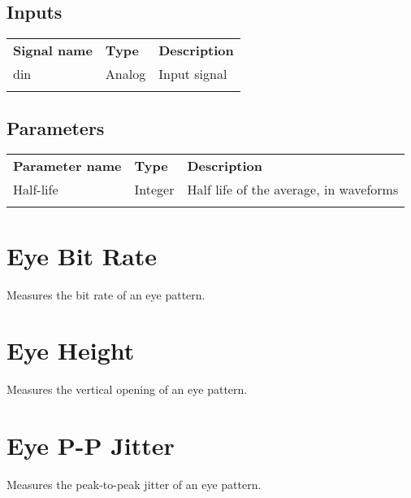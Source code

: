 \subsection{Inputs}

\begin{tabularx}{16cm}{llX}
\thickhline
\textbf{Signal name} & \textbf{Type} & \textbf{Description} \\
\thickhline
din & Analog & Input signal\\
\thickhline
\end{tabularx}

\subsection{Parameters}

\begin{tabularx}{16cm}{llX}
\thickhline
\textbf{Parameter name} & \textbf{Type} & \textbf{Description} \\
\thickhline
Half-life & Integer & Half life of the average, in waveforms\\
\thickhline
\end{tabularx}

\pagebreak
\section{Eye Bit Rate}

Measures the bit rate of an eye pattern.

\pagebreak
\section{Eye Height}

Measures the vertical opening of an eye pattern.

\pagebreak
\section{Eye P-P Jitter}

Measures the peak-to-peak jitter of an eye pattern.

\pagebreak
